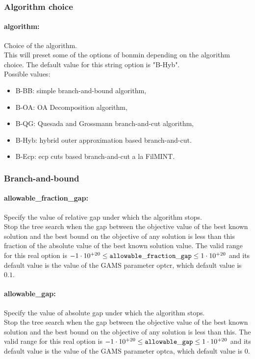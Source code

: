 \subsubsection{Algorithm choice}
\label{sec:Bonmin_algorithm_choice}
\paragraph{algorithm:} Choice of the algorithm. $\;$ \\
 This will preset some of the options of bonmin
depending on the algorithm choice.
The default value for this string option is "B-Hyb".
\\ 
Possible values:
\begin{itemize}
   \item B-BB: simple branch-and-bound algorithm,
   \item B-OA: OA Decomposition algorithm,
   \item B-QG: Quesada and Grossmann branch-and-cut algorithm,
   \item B-Hyb: hybrid outer approximation based branch-and-cut.
   \item B-Ecp: ecp cuts based branch-and-cut a la FilMINT.
\end{itemize}

\subsubsection{Branch-and-bound}
\label{sec:bonmin_branch-and-bound_options}
\paragraph{allowable\_fraction\_gap:} Specify the value of relative gap under which the algorithm stops. $\;$ \\
 Stop the tree search when the gap between the
objective value of the best known solution and
the best bound on the objective of any solution
is less than this fraction of the absolute value
of the best known solution value. The valid range for this real option is 
$-1 \cdot 10^{+20} \le {\tt allowable\_fraction\_gap } \le 1 \cdot 10^{+20}$
and its default value is the value of the GAMS parameter optcr, which default value is $0.1$.


\paragraph{allowable\_gap:} Specify the value of absolute gap under which the algorithm stops. $\;$ \\
 Stop the tree search when the gap between the
objective value of the best known solution and
the best bound on the objective of any solution
is less than this. The valid range for this real option is 
$-1 \cdot 10^{+20} \le {\tt allowable\_gap } \le 1 \cdot 10^{+20}$
and its default value is the value of the GAMS parameter optca, which default value is $0$.


